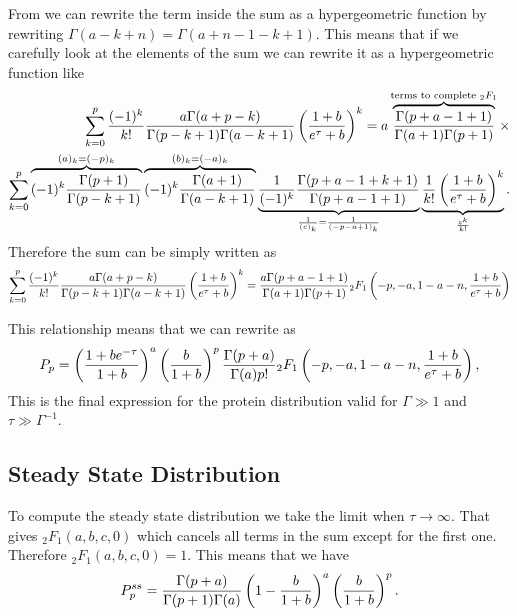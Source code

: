 From  we can rewrite the term inside the sum as a
hypergeometric function by rewriting $\Gamma(a - k + n) =
\Gamma(a + n - 1 - k + 1)$. This means that if we carefully look at the elements
of the sum we can rewrite it as a hypergeometric function like
\begin{align}
  \sum_{k=0}^p {(-1)^k \over k!}
  {a \Gamma(a + p - k) \over \Gamma(p - k + 1) \Gamma(a - k + 1)}
  \left( {1 + b \over e^\tau + b} \right)^k =
  a
  \overbrace{
  {\Gamma(p + a - 1 + 1) \over \Gamma(a + 1) \Gamma(p + 1)}
  }^{\text{terms to complete } {}_2F_1}
  \times \\
  \sum_{k=0}^p
  \overbrace{
  (-1)^k {\Gamma(p + 1) \over \Gamma(p - k + 1)}
  }^{(a)_k = (-p)_k}
  \overbrace{
  (-1)^k {\Gamma(a + 1) \over \Gamma(a - k + 1)}
  }^{(b)_k = (-a)_k}
  \underbrace{
  {1 \over (-1)^k }{\Gamma(p + a - 1 + k + 1) \over \Gamma(p + a - 1 + 1)}
  }_{{1 \over (c)_k} = {1 \over (-p - a + 1)_k}}
  \underbrace{
  {1 \over k!} \left( {1 + b \over e^\tau + b} \right)^k
  }_{z^k \over k!}.
\end{align}
Therefore the sum can be simply written as
\begin{equation}
\sum_{k=0}^p {(-1)^k \over k!}
  {a \Gamma(a + p - k) \over \Gamma(p - k + 1) \Gamma(a - k + 1)}
  \left( {1 + b \over e^\tau + b} \right)^k =
  {a \Gamma(p + a - 1 + 1) \over \Gamma(a + 1) \Gamma(p + 1)}
  {}_2F_1 \left( -p, -a, 1 - a - n, {1 + b \over e^\tau + b} \right)
\end{equation}

This relationship means that we can rewrite  as
\begin{equation}
  P_p = \left( {1 + b e^{-\tau} \over 1 + b} \right)^a
  \left( {b \over 1 + b} \right)^p
  {\Gamma(p + a) \over \Gamma(a) p!}
  {}_2F_1 \left( -p, -a, 1 - a - n, {1 + b \over e^\tau + b} \right),
\end{equation}
This is the final expression for the protein distribution valid for
$\Gamma \gg 1$ and $\tau \gg \Gamma^{-1}$.

\subsection{Steady State Distribution}
To compute the steady state distribution we take the limit when
$\tau \rightarrow \infty$. That gives ${}_2F_1(a, b, c, 0)$ which cancels all
terms in the sum except for the first one. Therefore ${}_2F_1(a, b, c, 0) = 1$.
This means that we have
\begin{equation}
  P_p^{ss} = {\Gamma(p + a) \over \Gamma(p + 1) \Gamma(a)}
  \left( 1 - {b \over 1 + b}  \right)^a
  \left( {b \over 1 + b} \right)^p.
\end{equation}

